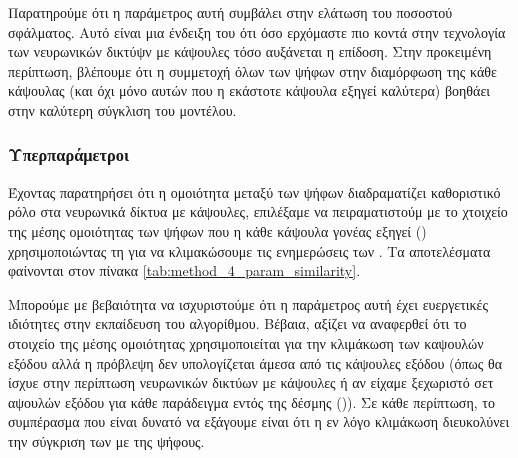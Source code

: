 Παρατηρούμε ότι η παράμετρος αυτή συμβάλει στην ελάτωση του ποσοστού σφάλματος. Αυτό είναι μια ένδειξη του ότι όσο ερχόμαστε πιο κοντά στην τεχνολογία των νευρωνικών δικτύψν με κάψουλες τόσο αυξάνεται η επίδοση. Στην προκειμένη περίπτωση, βλέπουμε ότι η συμμετοχή όλων των ψήφων στην διαμόρφωση της κάθε κάψουλας (και όχι μόνο αυτών που η εκάστοτε κάψουλα εξηγεί καλύτερα) βοηθάει στην καλύτερη σύγκλιση του μοντέλου.

\subsubsection{Υπερπαράμετροι }
Έχοντας παρατηρήσει ότι η ομοιότητα μεταξύ των ψήφων διαδραματίζει καθοριστικό ρόλο στα νευρωνικά δίκτυα με κάψουλες, επιλέξαμε να πειραματιστούμ με το χτοιχείο της μέσης ομοιότητας των ψήφων που η κάθε κάψουλα γονέας εξηγεί () χρησιμοποιώντας τη για να κλιμακώσουμε τις ενημερώσεις των . Τα αποτελέσματα φαίνονται στον πίνακα \ref{tab:method_4_param_similarity}.\par


\begin{table}[h]
    \begin{center}
    \end{center}
    \caption[]{\label{tab:method_4_param_similarity}Επίδραση της παραμέτρου  της μεθόδου 4 στην επίδοση (όπως μετράται από το ποσοστό σφάλματος) στο σύνολο δεδομένων ελέγχου . Τα πειράματα αυτά πραγματοποιήθηκαν για 10 εποχές με μέγεθος δέσμης ίσο με 8.} 
\end{table}

Μπορούμε με βεβαιότητα να ισχυριστούμε ότι η παράμετρος αυτή έχει ευεργετικές ιδιότητες στην εκπαίδευση του αλγορίθμου. Βέβαια, αξίζει να αναφερθεί ότι το στοιχείο της μέσης ομοιότητας χρησιμοποιείται για την κλιμάκωση των καψουλών εξόδου αλλά η πρόβλεψη δεν υπολογίζεται άμεσα από τις κάψουλες εξόδου (όπως θα ίσχυε στην περίπτωση νευρωνικών δικτύων με κάψουλες ή αν είχαμε ξεχωριστό σετ αψουλών εξόδου για κάθε παράδειγμα εντός της δέσμης ()). Σε κάθε περίπτωση, το συμπέρασμα που είναι δυνατό να εξάγουμε είναι ότι η εν λόγο κλιμάκωση διευκολύνει την σύγκριση των  με της ψήφους.

